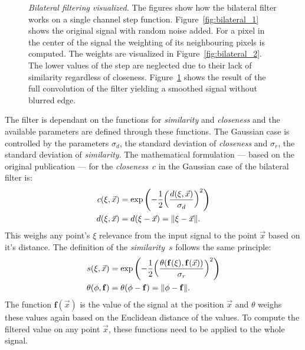 \begin{figure}[H]
\begin{subfigure}[b]{0.3\linewidth}
        \caption{}\label{fig:bilateral_3}
    \end{subfigure}
    \caption[Bilateral filtering visualized]{\emph{Bilateral filtering visualized.} The figures show how the bilateral filter works on a single channel step function. Figure~\ref{fig:bilateral_1} shows the original signal with random noise added. For a pixel in the center of the signal the weighting of its neighbouring pixels is computed. The weights are visualized in Figure~\ref{fig:bilateral_2}. The lower values of the step are neglected due to their lack of similarity regardless of closeness. Figure~\ref{fig:bilateral_3} shows the result of the full convolution of the filter yielding a smoothed signal without blurred edge.}\label{fig:bilateral_filter}
\end{figure}
The filter is dependant on the functions for \emph{similarity} and \emph{closeness} and the available parameters are defined through these functions.
The Gaussian case is controlled by the parameters $\sigma_d$, the standard deviation of \emph{closeness} and $\sigma_r$, the standard deviation of \emph{similarity}.
The mathematical formulation --- based on the original publication\cite{tomasi_iccv98} --- for the \emph{closeness}~$c$ in the Gaussian case of the bilateral filter is:
\begin{equation}
\begin{aligned}
    c(\xi, \vec{x})&= \exp\left(-\frac{1}{2}{\left(\frac{d(\xi, \vec{x})}{\sigma_d} \right)}^2 \right) \\
    d(\xi, \vec{x})&= d(\xi - \vec{x}) = \lVert\xi - \vec{x}\rVert \text{.}
\end{aligned}
\end{equation}
This weighs any point's $\xi$ relevance from the input signal to the point $\vec{x}$ based on it's distance.
The definition of the \emph{similarity}~$s$ follows the same principle:
\begin{equation}
\begin{aligned}
    s(\xi, \vec{x})&= \exp\left(-\frac{1}{2}{\left(\frac{\theta(\mathbf{f}(\xi), \mathbf{f}(\vec{x}))}{\sigma_r}\right)}^2\right) \\
    \theta(\phi, \mathbf{f})&= \theta(\phi - \mathbf{f}) = \lVert\phi - \mathbf{f}\rVert\text{.}
\end{aligned}
\end{equation}
The function $\mathbf{f}(\vec{x})$ is the value of the signal at the position $\vec{x}$ and $\theta$ weighs these values again based on the Euclidean distance of the values.
To compute the filtered value on any point $\vec{x}$, these functions need to be applied to the whole signal.
